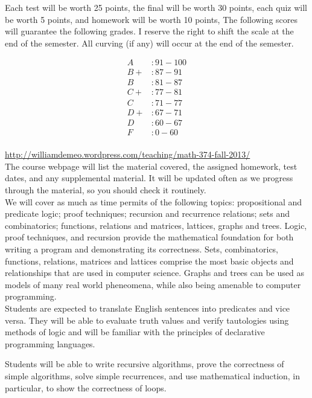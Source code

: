 \documentclass[12pt]{amsart}
\begin{document}
 Each test will be worth 25 points, the final
will be worth 30 points, each quiz will be worth 5 points, and homework will be worth 10 points, 
The following scores will guarantee the following grades. I reserve the right to shift the scale at the end of the semester. All curving (if any) will occur at the end of the semester.

$$ \begin{array}{ll}
A&:  91 - 100 \\
B+&: 87 - 91 \\
B &: 81 - 87 \\
C+&: 77 - 81 \\
C &: 71 - 77 \\
D+ &: 67 - 71 \\ 
D &: 60 - 67 \\
F &: 0 -60 
\end{array}$$ \\
    
\url{http://williamdemeo.wordpress.com/teaching/math-374-fall-2013/}\\
The course webpage will list the material covered, the assigned homework, test dates, and any
supplemental material. It will be updated often as we progress through the
material, so you should check it routinely.\\ 

 We will cover as much as time permits of the
following topics: propositional and predicate logic; proof techniques; recursion
and recurrence relations; sets and combinatorics; functions, relations and
matrices, lattices, graphs and trees. Logic, proof techniques, and recursion provide the
mathematical foundation for both writing a program and demonstrating its
correctness. Sets, combinatorics, functions, relations, matrices and lattices comprise
the most basic objects and relationships that are used in computer
science. Graphs and trees can be used as models of many real world pheneomena,
while also being amenable to computer programming. \\ 

 Students are expected to translate English
sentences into predicates and vice versa. They will be able to evaluate truth
values and verify tautologies using methods of logic and will be familiar with
the principles of declarative programming languages. 

Students will be able to write recursive algorithms, prove the correctness of
simple algorithms, solve simple recurrences, and use mathematical induction, in
particular, to show the correctness of loops. 
\end{document}
